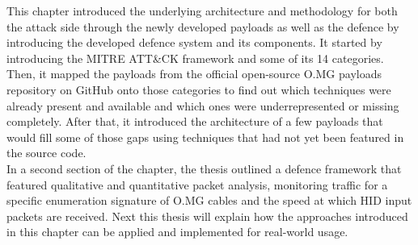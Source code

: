 This chapter introduced the underlying architecture and methodology for both the attack side through the newly developed payloads as well as the defence by introducing the developed defence system and its components. 
It started by introducing the MITRE ATT\&CK framework and some of its 14 categories. Then, it mapped the payloads from the official open-source O.MG payloads repository on GitHub onto those categories to find out which techniques were already present and available and which ones were underrepresented or missing completely. After that, it introduced the architecture of a few payloads that would fill some of those gaps using techniques that had not yet been featured in the source code. \\
In a second section of the chapter, the thesis outlined a defence framework that featured qualitative and quantitative packet analysis, monitoring traffic for a specific enumeration signature of O.MG cables and the speed at which HID input packets are received. Next this thesis will explain how the approaches introduced in this chapter can be applied and implemented for real-world usage. 



